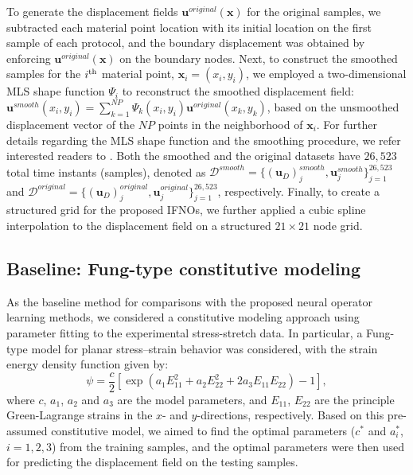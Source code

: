 \documentclass[twocolumn,10pt]{asme2ej}
\renewcommand{\~}{\tilde}
\renewcommand{\-}{\bar}
\newcommand{\8}{\infty}
\numberwithin{equation}{section}
\newcommand{\mcD}{\mathcal{D}}
\def \ub{\bm{u}}
\def \xb{\bm{x}}
\begin{document}
To generate the displacement fields $\ub^{original}(\xb)$ for the original samples, we subtracted each material point location with its initial location on the first sample of each protocol, and the boundary displacement was obtained by enforcing $\ub^{original}(\xb)$ on the boundary nodes.  Next, to construct the smoothed samples for the $i^{\rm th}$ material point, $\xb_i=(x_i,y_i)$, we employed a two-dimensional MLS shape function $\Psi_{i}$ to reconstruct the smoothed displacement field: $\ub^{smooth}(x_i,y_i)=\sum_{k=1}^{NP}\Psi_{k}(x_i,y_i)\ub^{original}(x_{k},y_{k})$, based on the unsmoothed displacement vector of the $NP$ points in the neighborhood of $\xb_i$. For further details regarding the MLS shape function and the smoothing procedure, we refer interested readers to  \cite{belytschko1996meshless,chen1996reproducing,you2022learning}.  Both the smoothed and the original datasets have $26,523$ total time instants (samples), denoted as $\mcD^{smooth}=\{(\ub_D)^{smooth}_j,\ub^{smooth}_j\}_{j=1}^{26,523}$ and $\mcD^{original}=\{(\ub_D)^{original}_j,\ub^{original}_j\}_{j=1}^{26,523}$, respectively. Finally, to create a structured grid for the proposed IFNOs, we further applied a cubic spline interpolation to the displacement field on a structured $21\times 21$ node grid.

\subsection{Baseline: Fung-type constitutive modeling}\label{sec:baseline}

As the baseline method for comparisons with the proposed neural operator learning methods, 
we considered a constitutive modeling approach using parameter fitting to the experimental stress-stretch data. In particular, a Fung-type model for planar stress--strain behavior was considered, with the strain energy density function given by:
$$\psi=\dfrac{c}{2}\left[\exp(a_1 E^2_{11}+a_2 E^2_{22}+2a_3 E_{11}E_{22})-1\right],$$
where $c$, $a_1$, $a_2$ and $a_3$ are the model parameters, and $E_{11}$, $E_{22}$ are the principle Green-Lagrange strains in the $x$- and $y$-directions, respectively. Based on this pre-assumed constitutive model, we aimed to find the optimal parameters ($c^*$ and $a_i^*$, $i=1,2,3$) from the training samples, and the optimal parameters were then used for predicting the displacement field on the testing samples.
\end{document}
